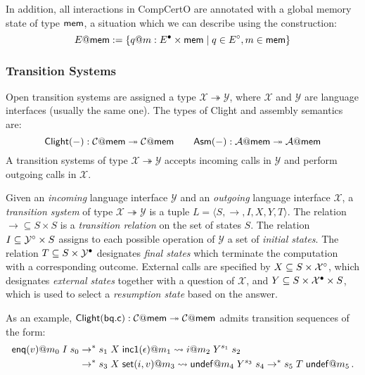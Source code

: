 \documentclass[acmsmall,review,anonymous]{acmart}\settopmatter{printfolios=true,printccs=false,printacmref=false}
\begin{document}
In addition,
all interactions in CompCertO
are annotated with a global memory state of type $ \mathsf{mem} $,
a situation which we can describe using the construction:
\[
  E@ \mathsf{mem}  := \{ q@m : E^\bullet \times  \mathsf{mem}  \mid
                   q \in E^\circ, m \in  \mathsf{mem}  \}
\]


\subsubsection{Transition Systems}

Open transition systems
are assigned a type
$\mathcal{X} \twoheadrightarrow \mathcal{Y}$,
where $\mathcal{X}$ and $\mathcal{Y}$ are
language interfaces (usually the same one).
The types of Clight and assembly semantics
are:
\[
   \mathsf{Clight} (-) :
    \mathcal{C}@ \mathsf{mem} 
    \twoheadrightarrow
    \mathcal{C}@ \mathsf{mem} 
  \qquad
   \mathsf{Asm} (-) :
    \mathcal{A}@ \mathsf{mem} 
    \twoheadrightarrow
    \mathcal{A}@ \mathsf{mem} 
\]
A transition systems of type $\mathcal{X} \twoheadrightarrow \mathcal{Y}$
accepts incoming calls in $\mathcal{Y}$
and perform outgoing calls in $\mathcal{X}$.

\begin{definition}
Given an \emph{incoming} language interface $\mathcal{Y}$
and an \emph{outgoing} language interface $\mathcal{X}$,
a \emph{transition system} of type
$\mathcal{X} \twoheadrightarrow \mathcal{Y}$
is a tuple $ L = \langle S, \rightarrow, I, X, Y, T \rangle $.
The relation
${\rightarrow} \subseteq S \times S$ is
a \emph{transition relation} on the set of states $S$.
The relation
$I \subseteq \mathcal{Y}^\circ \times S$ 
assigns to each possible operation of $\mathcal{Y}$
a set of \emph{initial states}.
The relation
$T \subseteq S \times \mathcal{Y}^\bullet$
designates \emph{final states}
which terminate the computation with a corresponding outcome.
External calls are specified by
$X \subseteq S \times \mathcal{X}^\circ$,
which designates \emph{external states} together with
a question of $\mathcal{X}$, and
$Y \subseteq S \times \mathcal{X}^\bullet \times S$,
which is used to select a \emph{resumption state}
based on the answer.
\end{definition}

As an example,
$
  \mathsf{Clight} ( \mathsf{bq.c} ) :
 \mathcal{C}@ \mathsf{mem}  \twoheadrightarrow \mathcal{C}@ \mathsf{mem} 
$
admits transition sequences of the form:
\begin{align*}
   \mathsf{enq} (v)@m_0 \mathrel{I}
  s_0 &\rightarrow^*
  s_1 \mathrel{X}
   \mathsf{inc1} (\epsilon)@m_1 \leadsto
  i@m_2 \mathrel{Y^{s_1}}
  s_2 \\&\rightarrow^*
  s_3 \mathrel{X}
   \mathsf{set} (i, v)@m_3 \leadsto
   \mathsf{undef} @m_4 \mathrel{Y^{s_3}}
  s_4 \rightarrow^*
  s_5 \mathrel{T}
   \mathsf{undef} @m_5
  \,.
\end{align*}
\end{document}
